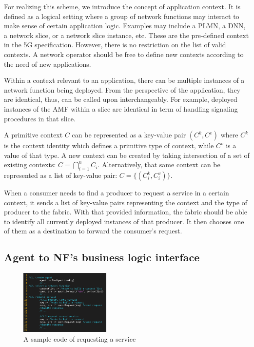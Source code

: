 \documentclass[conference]{IEEEtran}
\begin{document}
For realizing this scheme, we introduce the concept of application context. It
is defined as a logical setting where a group of network functions may interact
to make sense of certain application logic. Examples may include a PLMN, a
DNN, a network slice, or a network slice instance, etc. These are the
pre-defined context in the 5G specification. However, there is no restriction
on the list of valid contexts. A network operator should be free to define new
contexts according to the need of new applications.

Within a context relevant to an application, there can be multiple instances of
a network function being deployed. From the perspective of the application,
they are identical, thus, can be called upon interchangeably. For example,
deployed instances of the AMF within a slice are identical in term of handling
signaling procedures in that slice.

A primitive context $C$ can be represented as a key-value pair $(C^k, C^v)$
where $C^k$ is the context identity which defines a primitive type of context,
while $C^v$ is a value of that type. A new context can be created by taking
intersection of a set of existing contexts: $C = \bigcap_{i=1}^{n}{C_i}$.
Alternatively, that same context can be represented as a list of key-value
pair: $C=\{(C_i^k, C_i^v)\}$.  

When a consumer needs to find a producer to request a service in a certain
context, it sends a list of key-value pairs representing the context and the
type of producer to the fabric. With that provided information, the fabric
should be able to identify all currently deployed instances of that producer.
It then chooses one of them as a destination to forward the consumer's request.

\subsection{Agent to NF's business logic  interface}
\begin{figure}
\begin{center}
	\includegraphics[width=0.4\textwidth]{api}
	\caption{A sample code of requesting a service\label{fig:api}}
\end{center}
\end{figure}
\end{document}

